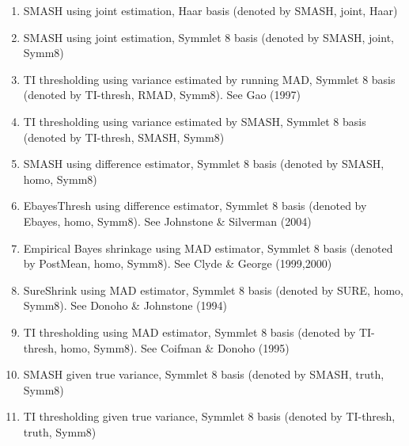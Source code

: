\documentclass[12pt]{article}
\begin{document}
\begin{enumerate}
\item SMASH using joint estimation, Haar basis (denoted by SMASH, joint, Haar)
\item SMASH using joint estimation, Symmlet 8 basis (denoted by SMASH, joint, Symm8)
\item TI thresholding using variance estimated by running MAD, Symmlet 8 basis (denoted by TI-thresh, RMAD, Symm8). See Gao (1997)
\item TI thresholding using variance estimated by SMASH, Symmlet 8 basis (denoted by TI-thresh, SMASH, Symm8)
\item SMASH using difference estimator, Symmlet 8 basis (denoted by SMASH, homo, Symm8)
\item EbayesThresh using difference estimator, Symmlet 8 basis (denoted by Ebayes, homo, Symm8). See Johnstone \& Silverman (2004)
\item Empirical Bayes shrinkage using MAD estimator, Symmlet 8 basis (denoted by PostMean, homo, Symm8). See Clyde \& George (1999,2000)
\item SureShrink using MAD estimator, Symmlet 8 basis (denoted by SURE, homo, Symm8). See Donoho \& Johnstone (1994)
\item TI thresholding using MAD estimator, Symmlet 8 basis (denoted by TI-thresh, homo, Symm8). See Coifman \& Donoho (1995)
\item SMASH given true variance, Symmlet 8 basis (denoted by SMASH, truth, Symm8)
\item TI thresholding given true variance, Symmlet 8 basis (denoted by TI-thresh, truth, Symm8)
\end{enumerate}
\end{document}
